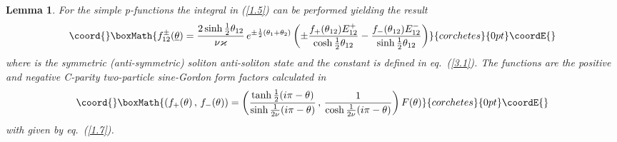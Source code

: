 \documentclass[a4paper,a4paper]{article}
\newtheorem{lemma}[theorem]{Lemma}
\begin{document}
\begin{lemma}
\label{l3}For the simple p-functions \coordHE{} the integral in (\ref{1.5})
can be performed yielding the result 
\[\coord{}\boxMath{
f_{12}^{\pm }(\underline{\theta })=\frac{2\sinh \tfrac{1}{2}\theta _{12}}{%
\nu \varkappa }\,e^{\pm \frac{1}{2}(\theta _{1}+\theta _{2})}\left( \pm 
\frac{f_{+}(\theta _{12})E_{12}^{+}}{\cosh \tfrac{1}{2}\theta _{12}}-\frac{%
f_{-}(\theta _{12})E_{12}^{-}}{\sinh \tfrac{1}{2}\theta _{12}}\right) 
}{corchetes}{0pt}\coordE{}\]
where \coordHE{} is the
symmetric (anti-symmetric) soliton anti-soliton state and the constant \myHighlight{$%
\varkappa $}\coordHE{} is defined in eq.~(\ref{3.1}). The functions \coordHE{}
are the positive and negative C-parity two-particle sine-Gordon form factors
calculated in \cite{KW} 
\[\coord{}\boxMath{
\left( f_{+}(\theta )\,,\,f_{-}(\theta )\right) =\left( \frac{\tanh \frac{1}{%
2}(i\pi -\theta )}{\sinh \frac{1}{2\nu }(i\pi -\theta )}\,,\,\frac{1}{\cosh 
\frac{1}{2\nu }(i\pi -\theta )}\right) F(\theta ) 
}{corchetes}{0pt}\coordE{}\]
with \coordHE{} given by eq.~(\ref{1.7}).
\end{lemma}
\end{document}
